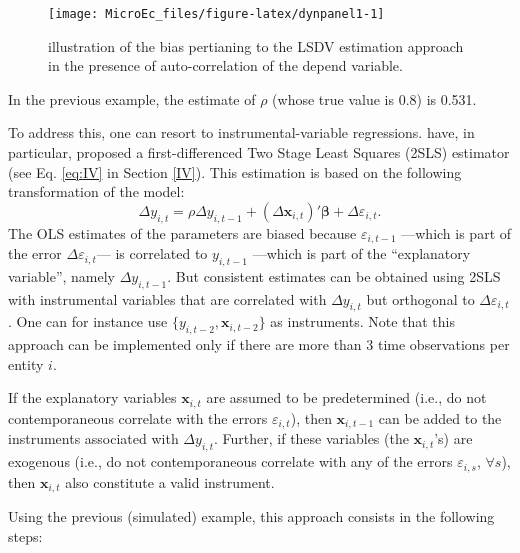 \documentclass[
  12pt,
]{book}
\theoremstyle{definition}
\theoremstyle{definition}
\theoremstyle{definition}
\theoremstyle{definition}
\theoremstyle{remark}
\begin{document}
\begin{figure}
\texttt{[image: MicroEc\_files/figure-latex/dynpanel1-1]} \caption{illustration of the bias pertianing to the LSDV estimation approach in the presence of auto-correlation of the depend variable.}\label{fig:dynpanel1}
\end{figure}

In the previous example, the estimate of \(\rho\) (whose true value is 0.8) is 0.531.

To address this, one can resort to instrumental-variable regressions. \citet{Anderson_Hsiao_1982} have, in particular, proposed a first-differenced Two Stage Least Squares (2SLS) estimator (see Eq. \eqref{eq:IV} in Section \ref{IV}). This estimation is based on the following transformation of the model:
\begin{equation}
\Delta y_{i,t} = \rho \Delta y_{i,t-1} + (\Delta \mathbf{x}_{i,t})'\boldsymbol\beta + \Delta\varepsilon_{i,t}.\label{eq:paneldynFisrtDiff}
\end{equation}
The OLS estimates of the parameters are biased because \(\varepsilon_{i,t-1}\) ---which is part of the error \(\Delta\varepsilon_{i,t}\)--- is correlated to \(y_{i,t-1}\) ---which is part of the ``explanatory variable'', namely \(\Delta y_{i,t-1}\). But consistent estimates can be obtained using 2SLS with instrumental variables that are correlated with \(\Delta y_{i,t}\) but orthogonal to \(\Delta\varepsilon_{i,t}\). One can for instance use \(\{y_{i,t-2},\mathbf{x}_{i,t-2}\}\) as instruments. Note that this approach can be implemented only if there are more than 3 time observations per entity \(i\).

If the explanatory variables \(\mathbf{x}_{i,t}\) are assumed to be predetermined (i.e., do not contemporaneous correlate with the errors \(\varepsilon_{i,t}\)), then \(\mathbf{x}_{i,t-1}\) can be added to the instruments associated with \(\Delta y_{i,t}\). Further, if these variables (the \(\mathbf{x}_{i,t}\)'s) are exogenous (i.e., do not contemporaneous correlate with any of the errors \(\varepsilon_{i,s}\), \(\forall s\)), then \(\mathbf{x}_{i,t}\) also constitute a valid instrument.

Using the previous (simulated) example, this approach consists in the following steps:
\end{document}
